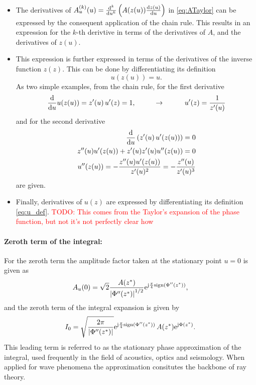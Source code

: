 \documentclass[11pt]{article}
\begin{document}
\begin{itemize}
    \item The derivatives of $A_u^{(k)}(u) = \frac{\mathrm{d}^k}{\mathrm{d} u^k}\left( A(z(u))\frac{\mathrm{d} z(u)}{\mathrm{d} u} \right)$ in \eqref{eq:ATaylor} can be expressed by the consequent application of the chain rule.
    This results in an expression for the $k$-th derivtive in terms of the derivatives of $A$, and the derivatives of $z(u)$.
    \item This expression is further expressed in terms of the derivatives of the inverse function $z(z)$.
    This can be done by differentiating its definition
    \begin{equation}
        u(z(u)) = u.  
    \end{equation}
    As two simple examples, from the chain rule, for the first derivative
    \begin{align}
        \frac{\mathrm{d}}{\mathrm{d} u} u(z(u)) = z'(u) \, u'(z) = 1, \hspace{1cm} \rightarrow \hspace{1cm} u'(z) = \frac{1}{z'(u)}
    \end{align}
    and for the second derivative
    \begin{eqnarray}
        \frac{\mathrm{d}}{\mathrm{d} u}\left( z'(u) \, u'(z(u)) \right) = 0 \\
        z''(u) u'(z(u)) + z'(u) z'(u)  u''(z(u))  = 0 \\
         u''(z(u))  = - \frac{z''(u) u'(z(u))}{z'(u)^2 }  = -\frac{z''(u)}{z'(u)^3} 
    \end{eqnarray}
    are given.
    \item Finally, derivatives of $u(z)$ are expressed by differentiating its definition \eqref{eq:u_def}.
    \textcolor{red}{TODO: This comes from the Taylor's expansion of the phase function, but not it's not perfectly clear how}
\end{itemize}
        
\paragraph{Zeroth term of the integral:}
For the zeroth term the amplitude factor taken at the stationary point $u=0$ is given as
\begin{equation}
    A_u(0) = \sqrt{2}\frac{A(z^*)}{\left| \Phi''(z^*) \right|^{1/2}} \mathrm{e}^{\mathrm{j} \frac{\pi}{4} \text{sign}(\Phi''(z^*))},
\end{equation}
and the zeroth term of the integral expansion is given by
\begin{equation}
    I_0 = \sqrt{\frac{2 \pi}{\left| \Phi''(z^*) \right|}} \mathrm{e}^{\mathrm{j} \frac{\pi}{4} \text{sign}(\Phi''(z^*))} \, A(z^*) \mathrm{e}^{ \mathrm{j} \Phi(z^*) }.
\end{equation}
This leading term is referred to as the stationary phase approximation of the integral, used frequently in the field of acoustics, optics and seismology.
When applied for wave phenomena the approximation consitutes the backbone of ray theory.
\end{document}
